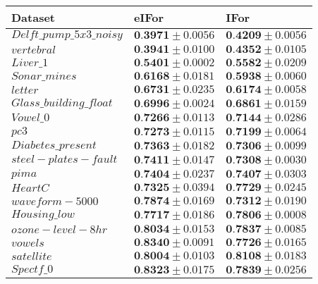 \documentclass{article}
\begin{document}
\begin{tabular}{lll}
\hline
 Dataset                   & eIFor                         & IFor                          \\
\hline
 $Delft\_pump\_5x3\_noisy$ & $\textbf{0.3971}  \pm 0.0056$ & $\textbf{0.4209}  \pm 0.0056$ \\
 $vertebral$               & $\textbf{0.3941}  \pm 0.0100$ & $\textbf{0.4352}  \pm 0.0105$ \\
 $Liver\_1$                & $\textbf{0.5401}  \pm 0.0002$ & $\textbf{0.5582}  \pm 0.0209$ \\
 $Sonar\_mines$            & $\textbf{0.6168}  \pm 0.0181$ & $\textbf{0.5938}  \pm 0.0060$ \\
 $letter$                  & $\textbf{0.6731}  \pm 0.0235$ & $\textbf{0.6174}  \pm 0.0058$ \\
 $Glass\_building\_float$  & $\textbf{0.6996}  \pm 0.0024$ & $\textbf{0.6861}  \pm 0.0159$ \\
 $Vowel\_0$                & $\textbf{0.7266}  \pm 0.0113$ & $\textbf{0.7144}  \pm 0.0286$ \\
 $pc3$                     & $\textbf{0.7273}  \pm 0.0115$ & $\textbf{0.7199}  \pm 0.0064$ \\
 $Diabetes\_present$       & $\textbf{0.7363}  \pm 0.0182$ & $\textbf{0.7306}  \pm 0.0099$ \\
 $steel-plates-fault$      & $\textbf{0.7411}  \pm 0.0147$ & $\textbf{0.7308}  \pm 0.0030$ \\
 $pima$                    & $\textbf{0.7404}  \pm 0.0237$ & $\textbf{0.7407}  \pm 0.0303$ \\
 $HeartC$                  & $\textbf{0.7325}  \pm 0.0394$ & $\textbf{0.7729}  \pm 0.0245$ \\
 $waveform-5000$           & $\textbf{0.7874}  \pm 0.0169$ & $\textbf{0.7312}  \pm 0.0190$ \\
 $Housing\_low$            & $\textbf{0.7717}  \pm 0.0186$ & $\textbf{0.7806}  \pm 0.0008$ \\
 $ozone-level-8hr$         & $\textbf{0.8034}  \pm 0.0153$ & $\textbf{0.7837}  \pm 0.0085$ \\
 $vowels$                  & $\textbf{0.8340}  \pm 0.0091$ & $\textbf{0.7726}  \pm 0.0165$ \\
 $satellite$               & $\textbf{0.8004}  \pm 0.0103$ & $\textbf{0.8108}  \pm 0.0183$ \\
 $Spectf\_0$               & $\textbf{0.8323}  \pm 0.0175$ & $\textbf{0.7839}  \pm 0.0256$ \\

\end{tabular}
\end{document}
